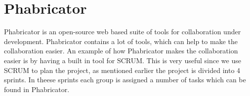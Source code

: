 \section{Phabricator}
Phabricator is an open-source web based suite of tools for collaboration under
development. Phabricator contains a lot of tools, which can help to make the
collaboration easier. An example of how Phabricator makes the collaboration
easier is by having a built in tool for SCRUM. This is very useful since we use
SCRUM to plan the project, as mentioned earlier the project is divided into 4
sprints. In theese sprints each group is assigned a number of tasks which can be
found in Phabricator. \cite{phabricator}
